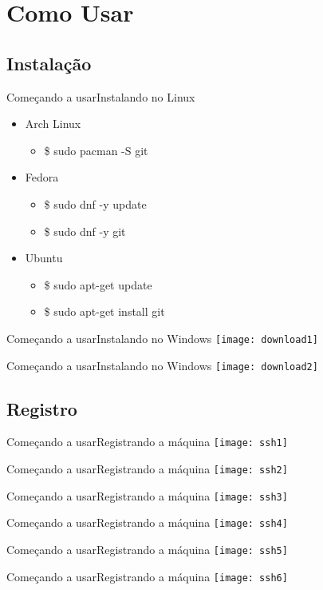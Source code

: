 \documentclass[10pt]{beamer}
\begin{document}
\section{Como Usar}
\subsection{Instalação}
\begin{frame}{Começando a usar}{Instalando no Linux}
  \begin{itemize}
  	\item Arch Linux
  	\begin{itemize}
  		\item \$ sudo pacman -S git
  	\end{itemize}
  	\item Fedora
  	\begin{itemize}
  		\item \$ sudo dnf -y update
  		\item \$ sudo dnf -y git
  	\end{itemize}
  	\item Ubuntu
  	\begin{itemize}
  		\item \$ sudo apt-get update
  		\item \$ sudo apt-get install git
  	\end{itemize}
  \end{itemize}
\end{frame}

\begin{frame}{Começando a usar}{Instalando no Windows}
  \texttt{[image: download1]}
\end{frame}
\begin{frame}{Começando a usar}{Instalando no Windows}
  \texttt{[image: download2]}
\end{frame}

\subsection{Registro}
\begin{frame}{Começando a usar}{Registrando a máquina}
  \texttt{[image: ssh1]}
\end{frame}
\begin{frame}{Começando a usar}{Registrando a máquina}
  \texttt{[image: ssh2]}
\end{frame}
\begin{frame}{Começando a usar}{Registrando a máquina}
  \texttt{[image: ssh3]}
\end{frame}
\begin{frame}{Começando a usar}{Registrando a máquina}
  \texttt{[image: ssh4]}
\end{frame}
\begin{frame}{Começando a usar}{Registrando a máquina}
  \texttt{[image: ssh5]}
\end{frame}
\begin{frame}{Começando a usar}{Registrando a máquina}
  \texttt{[image: ssh6]}
\end{frame}
\end{document}
